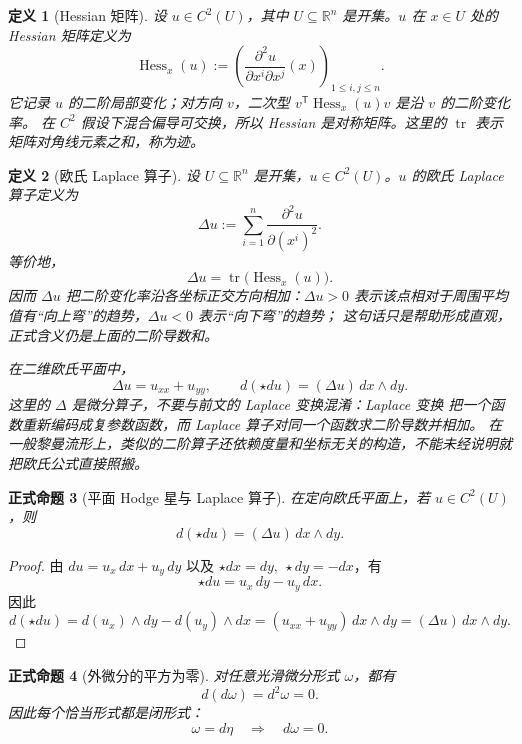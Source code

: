 \documentclass[UTF8,fontset=none,a4paper,11pt]{ctexart}
\theoremstyle{foundation-definition}
\newtheorem{definition}{定义}[section]
\theoremstyle{foundation-theorem}
\theoremstyle{foundation-proposition}
\newtheorem{proposition}[definition]{正式命题}
\theoremstyle{foundation-example}
\theoremstyle{foundation-remark}
\theoremstyle{foundation-theorem}
\begin{document}
\begin{definition}[Hessian 矩阵]\label{def:hessian}
设 \(u\in C^2(U)\)，其中 \(U\subseteq\mathbb R^n\) 是开集。\(u\) 在 \(x\in U\)
处的 Hessian 矩阵定义为
\[
  \operatorname{Hess}_x(u)
  :=\left(\frac{\partial^2u}{\partial x^i\partial x^j}(x)\right)_{1\leq i,j\leq n}.
\]
它记录 \(u\) 的二阶局部变化；对方向 \(v\)，二次型
\(v^{\mathsf T}\operatorname{Hess}_x(u)v\) 是沿 \(v\) 的二阶变化率。
在 \(C^2\) 假设下混合偏导可交换，所以 Hessian 是对称矩阵。这里的
\(\operatorname{tr}\) 表示矩阵对角线元素之和，称为迹。
\end{definition}

\begin{definition}[欧氏 Laplace 算子]\label{def:laplace-operator}
设 \(U\subseteq\mathbb R^n\) 是开集，\(u\in C^2(U)\)。\(u\) 的欧氏 Laplace
算子定义为
\[
\Delta u:=\sum_{i=1}^{n}\frac{\partial^2u}{\partial (x^i)^2}.
\]
等价地，
\[
\Delta u=\operatorname{tr}\bigl(\operatorname{Hess}_x(u)\bigr).
\]
因而 \(\Delta u\) 把二阶变化率沿各坐标正交方向相加：\(\Delta u>0\)
表示该点相对于周围平均值有“向上弯”的趋势，\(\Delta u<0\) 表示“向下弯”的趋势；
这句话只是帮助形成直观，正式含义仍是上面的二阶导数和。

在二维欧氏平面中，
\[
\Delta u=u_{xx}+u_{yy},
\qquad
d(\star du)=(\Delta u)\,dx\wedge dy.
\]
这里的 \(\Delta\) 是微分算子，不要与前文的 Laplace 变换混淆：Laplace 变换
把一个函数重新编码成复参数函数，而 Laplace 算子对同一个函数求二阶导数并相加。
在一般黎曼流形上，类似的二阶算子还依赖度量和坐标无关的构造，不能未经说明就
把欧氏公式直接照搬。
\end{definition}

\begin{proposition}[平面 Hodge 星与 Laplace 算子]\label{prop:hodge-laplace}
在定向欧氏平面上，若 \(u\in C^2(U)\)，则
\[
d(\star du)=(\Delta u)\,dx\wedge dy.
\]
\end{proposition}

\begin{proof}
由 \(du=u_x\,dx+u_y\,dy\) 以及
\(\star dx=dy,\ \star dy=-dx\)，有
\[
\star du=u_x\,dy-u_y\,dx.
\]
因此
\[
d(\star du)
=d(u_x)\wedge dy-d(u_y)\wedge dx
=(u_{xx}+u_{yy})\,dx\wedge dy
=(\Delta u)\,dx\wedge dy.
\]
\end{proof}

\begin{proposition}[外微分的平方为零]\label{prop:exterior-d-square}
对任意光滑微分形式 \(\omega\)，都有
\[
d(d\omega)=d^2\omega=0.
\]
因此每个恰当形式都是闭形式：
\[
\omega=d\eta\quad\Longrightarrow\quad d\omega=0.
\]
\end{proposition}
\end{document}
